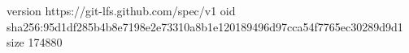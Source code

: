 version https://git-lfs.github.com/spec/v1
oid sha256:95d1df285b4b8e7198e2e73310a8b1e120189496d97cca54f7765ec30289d9d1
size 174880
